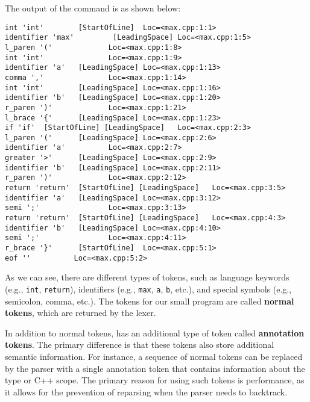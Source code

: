The output of the command is as shown below:
\begin{adjustwidth}{0em}{0em}
\begin{verbatim}
int 'int'        [StartOfLine]  Loc=<max.cpp:1:1>
identifier 'max'         [LeadingSpace] Loc=<max.cpp:1:5>
l_paren '('             Loc=<max.cpp:1:8>
int 'int'               Loc=<max.cpp:1:9>
identifier 'a'   [LeadingSpace] Loc=<max.cpp:1:13>
comma ','               Loc=<max.cpp:1:14>
int 'int'        [LeadingSpace] Loc=<max.cpp:1:16>
identifier 'b'   [LeadingSpace] Loc=<max.cpp:1:20>
r_paren ')'             Loc=<max.cpp:1:21>
l_brace '{'      [LeadingSpace] Loc=<max.cpp:1:23>
if 'if'  [StartOfLine] [LeadingSpace]   Loc=<max.cpp:2:3>
l_paren '('      [LeadingSpace] Loc=<max.cpp:2:6>
identifier 'a'          Loc=<max.cpp:2:7>
greater '>'      [LeadingSpace] Loc=<max.cpp:2:9>
identifier 'b'   [LeadingSpace] Loc=<max.cpp:2:11>
r_paren ')'             Loc=<max.cpp:2:12>
return 'return'  [StartOfLine] [LeadingSpace]   Loc=<max.cpp:3:5>
identifier 'a'   [LeadingSpace] Loc=<max.cpp:3:12>
semi ';'                Loc=<max.cpp:3:13>
return 'return'  [StartOfLine] [LeadingSpace]   Loc=<max.cpp:4:3>
identifier 'b'   [LeadingSpace] Loc=<max.cpp:4:10>
semi ';'                Loc=<max.cpp:4:11>
r_brace '}'      [StartOfLine]  Loc=<max.cpp:5:1>
eof ''          Loc=<max.cpp:5:2>
\end{verbatim}
\end{adjustwidth}
As we can see, there are different types of tokens, such as language keywords
(e.g., \texttt{int}, \texttt{return}), identifiers (e.g.,
\texttt{max}, \texttt{a}, \texttt{b}, etc.), and
special symbols (e.g., semicolon, comma, etc.). The tokens for our small program
are called \textbf{normal tokens}, which are returned by the lexer. 

In addition to normal tokens, \clang has an additional type of token called
\textbf{annotation tokens}. The primary difference is that these tokens also
store additional semantic information. For instance, a sequence of normal tokens
can be replaced by the parser with a single annotation token that contains
information about the type or C++ scope. The primary reason for using such
tokens is performance, as it allows for the prevention of reparsing when the
parser needs to backtrack. 

